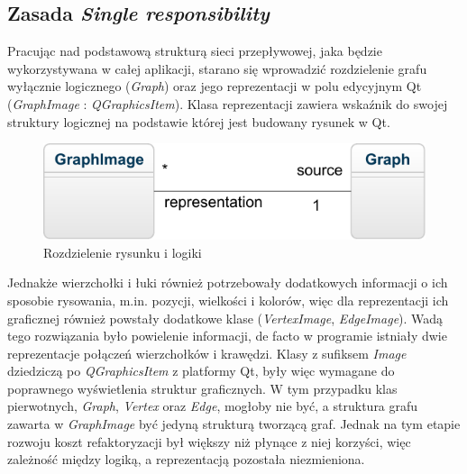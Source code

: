 \subsection{Zasada \textit{Single responsibility}}
Pracując nad podstawową strukturą sieci przepływowej, jaka będzie wykorzystywana w całej aplikacji, starano się wprowadzić rozdzielenie grafu wyłącznie logicznego (\emph{Graph}) oraz jego reprezentacji w polu edycyjnym Qt (\emph{GraphImage} : \emph{QGraphicsItem}). Klasa reprezentacji zawiera wskaźnik do swojej struktury logicznej na podstawie której jest budowany rysunek w Qt.
\begin{figure}[H]
	\centering
	\includegraphics[width=0.4\linewidth]{./img/SOLID_SR.pdf}
	\caption{Rozdzielenie rysunku i logiki}
	\label{fig:SOLD_SR}
\end{figure}
Jednakże wierzchołki i łuki również potrzebowały dodatkowych informacji o ich sposobie rysowania, m.in. pozycji, wielkości i kolorów, więc dla reprezentacji ich graficznej również powstały dodatkowe klase (\emph{VertexImage}, \emph{EdgeImage}). Wadą tego rozwiązania było powielenie informacji, de facto w programie istniały dwie reprezentacje połączeń wierzchołków i krawędzi. Klasy z sufiksem \emph{Image} dziedziczą po \emph{QGraphicsItem} z platformy Qt, były więc wymagane do poprawnego wyświetlenia struktur graficznych. W tym przypadku klas pierwotnych, \emph{Graph}, \emph{Vertex} oraz \emph{Edge}, mogłoby nie być, a struktura grafu zawarta w \emph{GraphImage} być jedyną strukturą tworzącą graf. Jednak na tym etapie rozwoju koszt refaktoryzacji był większy niż płynące z niej korzyści, więc zależność między logiką, a reprezentacją pozostała niezmieniona.
